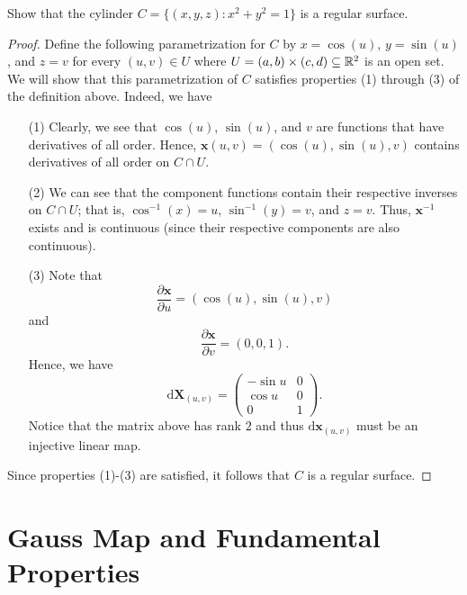 \documentclass[a4paper]{article}
\begin{document}
\begin{problem}
    Show that the cylinder \( C = \{ (x,y,z) : x^{2} + y^{2} = 1  \}  \) is a regular surface.
\end{problem}
\begin{proof}
Define the following parametrization for \( C  \) by \( x = \cos (u) \), \( y = \sin (u) \), and \( z = v  \) for every \( (u,v) \in U  \) where \( U = (a,b) \times (c,d) \subseteq \mathbb{R}^{2} \) is an open set.
We will show that this parametrization of \( C  \) satisfies properties (1) through (3) of the definition above. 
Indeed, we have 
\begin{enumerate}
    \item[(1)] Clearly, we see that \( \cos(u) \), \( \sin(u) \), and \( v  \) are functions that have derivatives of all order. Hence, \( \textbf{x}(u,v) = (\cos(u), \sin(u), v)  \) contains derivatives of all order on \( C \cap U  \). 
    \item[(2)] We can see that the component functions contain their respective inverses on \( C \cap U  \); that is, \( \cos^{-1}(x) = u  \), \( \sin^{-1}(y) = v   \), and \( z = v  \). Thus, \(  \textbf{x}^{-1} \) exists and is continuous (since their respective components are also continuous).
    \item[(3)] Note that  
        \[  \frac{ \partial \textbf{x} }{ \partial u  }  = (\cos(u), \sin(u), v) \]
        and
            \[  \frac{ \partial \textbf{x} }{ \partial v  }  = (0,0,1). \]
            Hence, we have 
            \[  \text{d} \textbf{X}_{(u,v)} = \begin{pmatrix} - \sin u & 0 \\ \cos u & 0 \\ 0 & 1  \end{pmatrix}. \]
            Notice that the matrix above has rank \( 2  \) and thus \( \text{d} \textbf{x}_{(u,v)} \) must be an injective linear map.
\end{enumerate}
Since properties (1)-(3) are satisfied, it follows that \( C  \) is a regular surface.
\end{proof}

\section{Gauss Map and Fundamental Properties}
\end{document}
